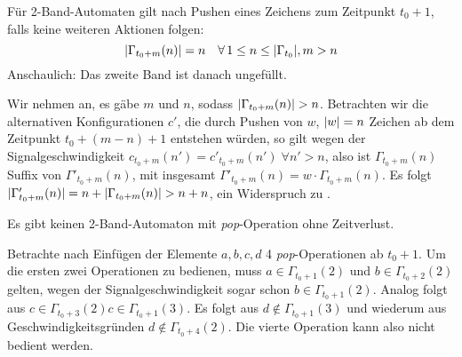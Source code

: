 \documentclass{article}
\begin{document}
\begin{lemma}
    \label{lem:2tape-halffilled}
    Für 2-Band-Automaten gilt nach Pushen eines Zeichens zum Zeitpunkt $t_0 + 1$, falls keine weiteren Aktionen folgen:
    \[ \lvert\Gamma_{t_0+m}(n)\rvert = n \quad\forall\, 1 \leq n \leq \lvert\Gamma_{t_0}\rvert,m > n \]
    Anschaulich: Das zweite Band ist danach ungefüllt.
    \begin{beweis}
        Wir nehmen an, es gäbe $m$ und $n$, sodass $\lvert\Gamma_{t_0+m}(n)\rvert > n$. Betrachten wir die alternativen Konfigurationen $c'$, die durch Pushen von $w$, $\lvert w\rvert=n$ Zeichen ab dem Zeitpunkt $t_0+(m-n)+1$ entstehen würden, so gilt wegen der Signalgeschwindigkeit $c_{t_0+m}(n') = c'_{t_0+m}(n') \;\forall n' > n$, also ist $\Gamma_{t_0+m}(n)$ Suffix von $\Gamma'_{t_0+m}(n)$, mit  insgesamt $\Gamma'_{t_0+m}(n) = w \cdot \Gamma_{t_0+m}(n)$. Es folgt $\lvert\Gamma'_{t_0+m}(n)\rvert = n + \lvert\Gamma_{t_0+m}(n)\rvert > n + n$, ein Widerspruch zu .
    \end{beweis}
\end{lemma}

\begin{satz}
    Es gibt keinen 2-Band-Automaton mit \emph{pop}-Operation ohne Zeitverlust.
    \begin{beweis}
        Betrachte nach Einfügen der Elemente $a, b, c, d$ 4 \emph{pop}-Operationen ab $t_0+1$. Um die ersten zwei Operationen zu bedienen, muss $a \in \Gamma_{t_0+1}(2)$ und $b \in \Gamma_{t_0+2}(2)$ gelten, wegen der Signalgeschwindigkeit sogar schon $b \in \Gamma_{t_0+1}(2)$. Analog folgt aus $c \in \Gamma_{t_0+3}(2) c \in \Gamma_{t_0+1}(3)$. Es folgt aus  $d \notin \Gamma_{t_0+1}(3)$ und wiederum aus Geschwindigkeitsgründen $d \notin \Gamma_{t_0+4}(2)$. Die vierte Operation kann also nicht bedient werden.
    \end{beweis}
\end{satz}
\end{document}
